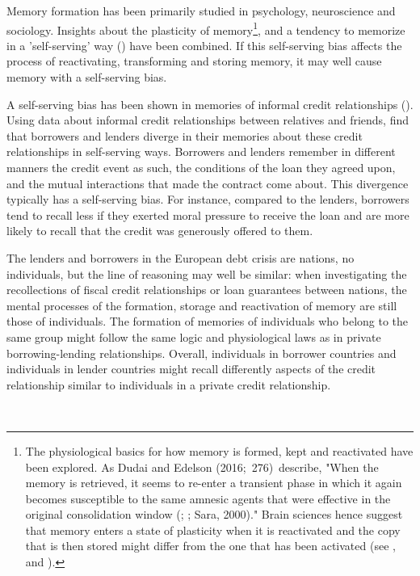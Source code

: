 Memory formation has been primarily studied in psychology, neuroscience and sociology.
Insights about the plasticity of memory\footnote{%
The physiological basics for how memory is formed, kept and reactivated have
been explored. As Dudai and Edelson (2016;\ 276)\ describe, "When the memory
is retrieved, it seems to re-enter a transient phase in which it again
becomes susceptible to the same amnesic agents that were effective in the
original consolidation window (\cite{dudai}; \cite{nader}; Sara,
2000)." Brain sciences hence suggest that memory enters a state of
plasticity when it is reactivated and the copy that is then stored might
differ from the one that has been activated (see \cite{agren}, and \cite{lee}).}, and a tendency to memorize in a 'self-serving' way
(\cite{bell}) have been combined. If this self-serving bias
affects the process of reactivating, transforming and storing memory, it may well
cause memory with a self-serving bias.

A self-serving bias has been shown in memories of informal credit relationships (\cite{dezso}). Using data about informal credit
relationships between relatives and friends, \cite{dezso} find that borrowers and
lenders diverge in their memories about these credit relationships in self-serving
 ways.
Borrowers and lenders remember in different manners the credit event
as such, the conditions of the loan they agreed upon, and the mutual
interactions that made the contract come about. This divergence typically
has a self-serving bias. For instance, compared to the lenders, borrowers
tend to recall less if they exerted moral pressure to receive the loan and
are more likely to recall that the credit was generously offered to them.

The lenders and borrowers in the European debt crisis are
nations, no individuals, but the line of reasoning may well be
similar: when investigating the recollections of fiscal credit relationships or
loan guarantees between nations, the mental processes of the formation,
storage and reactivation of memory are still those of individuals.
The formation of memories of individuals who belong to the same group might
follow the same logic and physiological laws as in private
borrowing-lending relationships. Overall, individuals in borrower
countries and individuals in lender countries might recall differently
aspects of the credit relationship similar to individuals in a private credit relationship. 

\\

